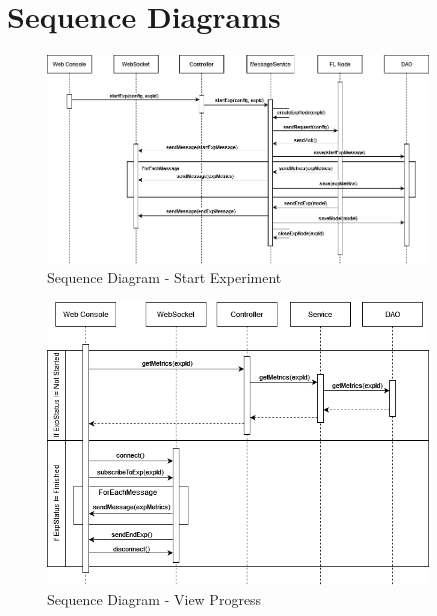 \newpage
\section{Sequence Diagrams}

\begin{figure}[ht!]
    \centering
    \includegraphics[width=0.9\textwidth]{images/2_analisys/sequence-diagram-start-exp.png}
    \caption{Sequence Diagram - Start Experiment}
    \label{fig:sequence_diagram_start_exp}
\end{figure}

\begin{figure}[ht!]
    \centering
    \includegraphics[width=0.9\textwidth]{images/2_analisys/sequence-diagram-view-progress.png}
    \caption{Sequence Diagram - View Progress}
    \label{fig:sequence_diagram_view_progress}
\end{figure}


